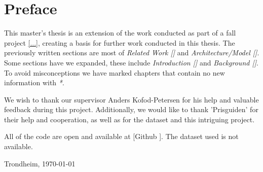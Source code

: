 \section*{Preface}



\vspace{1cm}

This master's thesis is an extension of the work conducted as part of a fall project \cref{...},
creating a basis for further work conducted in this thesis.
The previously written sections are most of
\textit{Related Work []} and \textit{Architecture/Model []}.
Some sections have we expanded, these include \textit{Introduction [] } and
\textit{Background []}.
To avoid misconceptions we have marked chapters that contain no new
information with \textit{*}.

We wish to thank our supervisor Anders Kofod-Petersen for his help and valuable feedback during this project.
Additionally, we would like to thank 'Prisguiden' for their help and cooperation,
as well as for the dataset and this intriguing project.

All of the code are open and available at [Github \cite{githubSource}]. The dataset used is not available.

\vfill

\hfill \thesisAuthor

\hfill Trondheim, \today